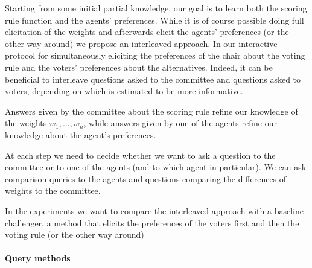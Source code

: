 \documentclass[12pt]{article}
\newcommand{\pprofile}{\textbf{p}}%
\newcommand{\w}{\textbf{w}}%
\begin{document}
Starting from some initial partial knowledge, our goal is to learn both the scoring rule function and the agents' preferences.
While it is of course possible doing full elicitation of the weights and afterwards elicit the agents' preferences (or the other way around) we propose an interleaved approach.
In our interactive  protocol for simultaneously eliciting the preferences of the chair about the voting rule and the voters' preferences about the alternatives.
Indeed, it can be beneficial to interleave questions asked to the committee and questions asked to voters, depending on which is estimated to be more informative.

Answers given by the committee about the scoring rule refine our knowledge of the weights $w_1,\ldots,w_n$, while
answers given by one of the agents refine our knowledge about the agent's preferences.

At each step we need to decide whether we want to ask a question to the committee or to one of the agents (and to which agent in particular). We can ask comparison queries to the agents and questions comparing the differences of weights to the committee. 

In the experiments we want to compare the interleaved approach with a baseline challenger, a method  that elicits the preferences of the voters first and then the voting rule (or the other way around)

\paragraph{Query methods}


\end{document}
